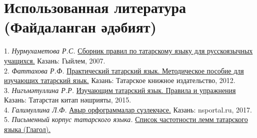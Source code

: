 \section*{Использованная литература (Файдаланган әдәбият)}
1. \textit{Нурмухаметова Р.С.} \href{https://drive.google.com/file/d/1WxgdTw2QcTSWD7AcEJPbFNu7uoUrkDlI}{Сборник правил по татарскому языку для русскоязычных учащихся.} Казань: Гыйлем, 2007.\\
2. \textit{Фаттахова Р.Ф.} \href{https://drive.google.com/file/d/1qdAhPHIpGOxCk8h13O5H-LFyS9Xe_KPL}{Практический татарский язык. Методическое пособие для изучающих татарский язык.} Казань: Татарское книжное издательство, 2012.\\
3. \textit{Нигъмәтуллина Р.Р.} \href{https://drive.google.com/file/d/1u9ZbOBUhGoxTsCxFNzWdvRoypuLZviES/view?usp=sharing}{Изучающим татарский язык. Правила и упражнения} Казань: Татарстан китап нәшрияты, 2015.\\
4. \textit{Галимуллина Л.Ф.} \href{https://drive.google.com/file/d/11BHybrl1L4Qd3KuPNcSLMEI_4dHGmG5F}{Авыр орфограммалар сүзлекчәсе.} Казань: nsportal.ru, 2017.\\
5. \textit{Письменный корпус татарского языка.} \href{https://www.corpus.tatar/stat/tatcorpus2.lemmas_frequency_v.txt}{Список частотности лемм татарского языка (Глагол).}
